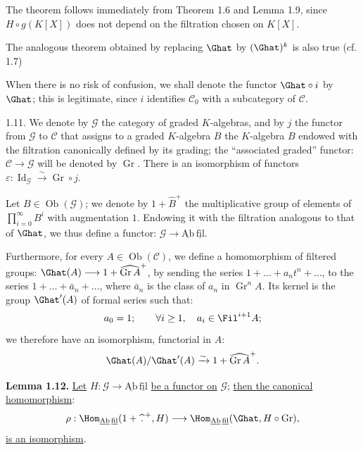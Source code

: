 The theorem follows immediately from Theorem 1.6 and Lemma 1.9, since \(H\circ g(K[X])\) does not depend on the filtration chosen on \(K[X]\).

The analogous theorem obtained by replacing \(\Ghat\) by \((\Ghat)^k\) is also true (cf. 1.7)

When there is no risk of confusion, we shall denote the functor \(\Ghat\circ i\) by \(\Ghat\); this is legitimate, since \(i\) identifies \(\mathcal C_0\) with a subcategory of \(\mathcal C\).

1.11. We denote by \(\mathcal G\) the category of graded \(K\)-algebras, and by \(j\) the functor from \(\mathcal G\) to \(\mathcal C\) that assigns to a graded \(K\)-algebra \(B\) the \(K\)-algebra \(B\) endowed with the filtration canonically defined by its grading; the ``associated graded'' functor: \(\mathcal C\to\mathcal G\) will be denoted by \(\operatorname{Gr}\). There is an isomorphism of functors \(\varepsilon:\operatorname{Id}_{\mathcal G}\xrightarrow{\sim}\operatorname{Gr}\circ j\).

Let \(B\in\operatorname{Ob}(\mathcal G)\); we denote by \(1+\widehat B^+\) the multiplicative group of elements of \(\prod\limits_{i=0}^{\infty}B^i\) with augmentation \(1\). Endowing it with the filtration analogous to that of \(\Ghat\), we thus define a functor: \(\mathcal G\to\underline{\mathrm{Ab}}\,\underline{\mathrm{fil}}\).

Furthermore, for every \(A\in\operatorname{Ob}(\mathcal C)\), we define a homomorphism of filtered groups: \(\Ghat(A)\longrightarrow 1+\widehat{\operatorname{Gr}A}^{+}\), by sending the series \(1+\ldots+a_nt^n+\ldots\),
%
to the series \(1+\ldots+\bar a_n+\ldots\), where \(\bar a_n\) is the class of \(a_n\) in \(\operatorname{Gr}^nA\). Its kernel is the group \(\Ghat'(A)\) of formal series such that:
\[
  a_0=1;\qquad \forall i\geq1,\quad a_i\in\Fil^{i+1}A;
\]
we therefore have an isomorphism, functorial in \(A\):
\[
  \Ghat(A)/\Ghat'(A)\xrightarrow{\sim}1+\widehat{\operatorname{Gr}A}^{+}.
\]

\textbf{Lemma 1.12.} \uline{Let} \(H:\mathcal G\to\underline{\mathrm{Ab}}\,\underline{\mathrm{fil}}\) \uline{be a functor on} \(\mathcal G\); \uline{then the canonical homomorphism}:
\[
  \rho:\Hom_{\underline{\mathrm{Ab}}\,\underline{\mathrm{fil}}}(1+\widehat{\,\mathord{.}\,}^{+},H)
  \longrightarrow
  \Hom_{\underline{\mathrm{Ab}}\,\underline{\mathrm{fil}}}(\Ghat,H\circ\operatorname{Gr}),
\]
\uline{is an isomorphism}.

